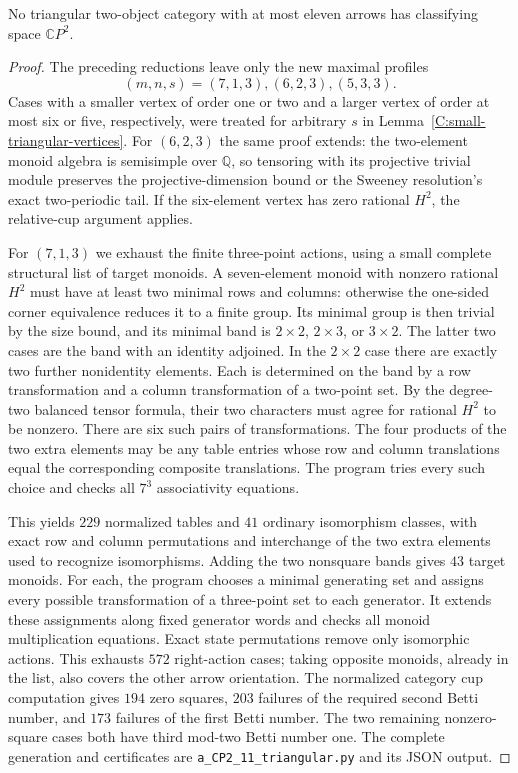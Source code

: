 \begin{lemma}
\label{C:triangular-eleven}
No triangular two-object category with at most eleven arrows has
classifying space $\mathbb CP^2$.
\end{lemma}
\begin{proof}
The preceding reductions leave only the new maximal profiles
\[
 (m,n,s)=(7,1,3),(6,2,3),(5,3,3).
\]
Cases with a smaller vertex of
order one or two and a larger vertex of order at most six or five,
respectively, were treated for arbitrary $s$ in
Lemma~\ref{C:small-triangular-vertices}.
For $(6,2,3)$ the same proof extends: the two-element monoid algebra
is semisimple over $\mathbb Q$, so tensoring with its projective
trivial module preserves the projective-dimension bound or the
Sweeney resolution's exact two-periodic tail. If the six-element
vertex has zero rational $H^2$, the relative-cup argument applies.

For $(7,1,3)$ we exhaust the finite three-point actions, using a small
complete structural list of target monoids. A seven-element monoid
with nonzero rational $H^2$ must have at least two minimal rows and
columns: otherwise the one-sided corner equivalence reduces it to a
finite group. Its minimal group is then trivial by the size bound,
and its minimal band is $2\times2$, $2\times3$, or $3\times2$.
The latter two cases are the band with an identity adjoined.
In the $2\times2$ case there are exactly two further nonidentity
elements. Each is determined on the band by a row transformation and
a column transformation of a two-point set. By the degree-two
balanced tensor formula, their two characters must agree for rational
$H^2$ to be nonzero. There are six such pairs of transformations.
The four products of the two extra elements may be any table entries
whose row and column translations equal the corresponding composite
translations. The program tries every such choice and checks all
$7^3$ associativity equations.

This yields $229$ normalized tables and $41$ ordinary isomorphism
classes, with exact row and column permutations and interchange of
the two extra elements used to recognize isomorphisms. Adding the
two nonsquare bands gives $43$ target monoids. For each, the program
chooses a minimal generating set and assigns every possible
transformation of a three-point set to each generator. It extends
these assignments along fixed generator words and checks all monoid
multiplication equations. Exact state permutations remove only
isomorphic actions. This exhausts $572$ right-action cases; taking
opposite monoids, already in the list, also covers the other arrow
orientation. The normalized category cup computation gives $194$
zero squares, $203$ failures of the required second Betti number,
and $173$ failures of the first Betti number. The two remaining
nonzero-square cases both have third mod-two Betti number one.
The complete generation and certificates are
\texttt{a\_CP2\_11\_triangular.py} and its JSON output.


\end{proof}
